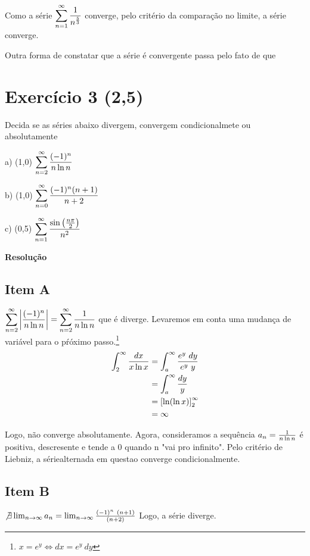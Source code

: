 \documentclass[12pt,openany]{book}
\newcommand{\LI}[1][n]{\lim_{{#1} \rightarrow \infty}}
\newcommand{\soma}[2][n]{\sum_{{#1} = #2}^\infty}
\newcommand{\E}[1]{Exercício #1}
\newcommand{\Resolve}{\begin{center} \textbf{Resolução} \end{center}}
\begin{document}
{{\begin{multicols}{2}
Como a série $\displaystyle{\soma{1} {1 \over n^{5 \over 3}}}$ converge, pelo critério da comparação no limite, a série converge.


Outra forma de constatar que a série  é convergente passa pelo fato de que
\end{multicols}

\newpage

\section*{\E{3} (2,5)}{Decida se as séries abaixo divergem, convergem condicionalmete ou absolutamente}

\begin{multicols}{3}
a) (1,0) $\displaystyle{\soma{2} {(-1)^n \over n \ln{n}}}$

b) (1,0) $\displaystyle{\soma{0} {(-1)^n(n+1) \over n+2}}$

c) (0,5) $\displaystyle{\soma{1} {\sin\left({n\pi \over 2}\right) \over n^2}}$
\end{multicols}

\Resolve

\begin{multicols}{3}
\subsection*{Item A}
$\displaystyle{\soma{2} \left|{(-1)^n \over n \ln{n}}\right| = \soma{2} {1 \over n \ln{n}}}$ que é diverge. Levaremos em conta uma mudança de variável para o pŕóximo passo.\footnote{$x = e^y \Longleftrightarrow dx = e^y \ dy$} \begin{align*}
\int_2^\infty {dx \over x\ln{x}} &= \int_a^\infty {e^y \ dy \over e^y \ y} \\
&= \int_a^\infty {dy \over y} \\
&= \left[\ln({\ln{x}})\right]_2^\infty \\
&= \infty
\end{align*}

Logo, não converge absolutamente. Agora, consideramos a sequência $a_n = {1 \over n\ln{n}}$ é positiva, descresente e tende a 0 quando n "vai pro infinito". Pelo critério de Liebniz, a sériealternada em questao converge condicionalmente.

\subsection*{Item B}
$\not \exists \LI a_n = \LI {(-1)^n \ (n+1) \over (n+2)}$ Logo, a série diverge.


\end{multicols}}}
\end{document}
